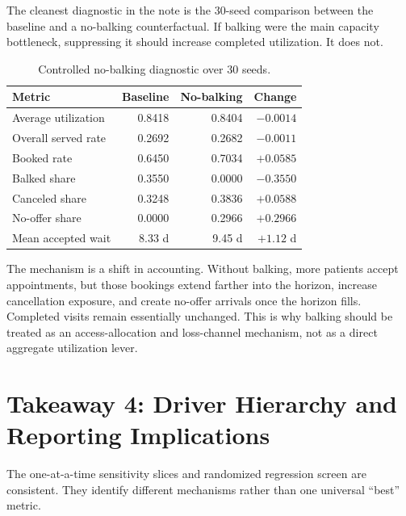 \documentclass[11pt]{article}
\begin{document}
The cleanest diagnostic in the note is the 30-seed comparison between the
baseline and a no-balking counterfactual. If balking were the main capacity
bottleneck, suppressing it should increase completed utilization. It does not.

\begin{table}[h]
\centering
\small
\renewcommand{\arraystretch}{1.10}
\begin{tabularx}{\textwidth}{Yrrr}
\toprule
Metric & Baseline & No-balking & Change \\
\midrule
Average utilization & 0.8418 & 0.8404 & \(-0.0014\) \\
Overall served rate & 0.2692 & 0.2682 & \(-0.0011\) \\
Booked rate & 0.6450 & 0.7034 & \(+0.0585\) \\
Balked share & 0.3550 & 0.0000 & \(-0.3550\) \\
Canceled share & 0.3248 & 0.3836 & \(+0.0588\) \\
No-offer share & 0.0000 & 0.2966 & \(+0.2966\) \\
Mean accepted wait & 8.33 d & 9.45 d & \(+1.12\) d \\
\bottomrule
\end{tabularx}
\caption{Controlled no-balking diagnostic over 30 seeds.}
\end{table}

The mechanism is a shift in accounting. Without balking, more patients accept
appointments, but those bookings extend farther into the horizon, increase
cancellation exposure, and create no-offer arrivals once the horizon fills.
Completed visits remain essentially unchanged. This is why balking should be
treated as an access-allocation and loss-channel mechanism, not as a direct
aggregate utilization lever.

\section{Takeaway 4: Driver Hierarchy and Reporting Implications}

The one-at-a-time sensitivity slices and randomized regression screen are
consistent. They identify different mechanisms rather than one universal
``best'' metric.
\end{document}
